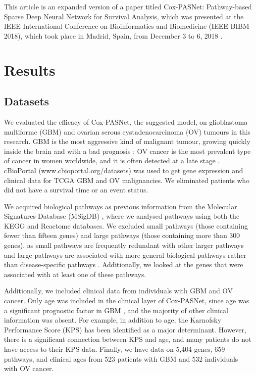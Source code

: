 \documentclass[10pt,twocolumn,twoside,lineno]{gsajnl}
\begin{document}
This article is an expanded version of a paper titled Cox-PASNet: Pathway-based Sparse Deep Neural Network for Survival Analysis, which was presented at the IEEE International Conference on Bioinformatics and Biomedicine (IEEE BIBM 2018), which took place in Madrid, Spain, from December 3 to 6, 2018 \citep{8621345}. 


\section{Results}
\subsection{Datasets}

We evaluated the efficacy of Cox-PASNet, the suggested model, on glioblastoma multiforme (GBM) and ovarian serous cystadenocarcinoma (OV) tumours in this research. GBM is the most aggressive kind of malignant tumour, growing quickly inside the brain and with a bad prognosis \citep{no28}; OV cancer is the most prevalent type of cancer in women worldwide, and it is often detected at a late stage \citep{BrettM2017}. cBioPortal (www.cbioportal.org/datasets) was used to get gene expression and clinical data for TCGA GBM and OV malignancies. We eliminated patients who did not have a survival time or an event status.


We acquired biological pathways as previous information from the Molecular Signatures Database (MSigDB) \citep{Subramanian15545}, where we analysed pathways using both the KEGG and Reactome databases. We excluded small pathways (those containing fewer than fifteen genes) and large pathways (those containing more than 300 genes), as small pathways are frequently redundant with other larger pathways and large pathways are associated with more general biological pathways rather than disease-specific pathways \citep{Reimand2019}. Additionally, we looked at the genes that were associated with at least one of these pathways.


Additionally, we included clinical data from individuals with GBM and OV cancer. Only age was included in the clinical layer of Cox-PASNet, since age was a significant prognostic factor in GBM \citep{10.1371/journal.pone.0154313}, and the majority of other clinical information was absent. For example, in addition to age, the Karnofsky Performance Score (KPS) has been identified as a major determinant. However, there is a significant connection between KPS and age, and many patients do not have access to their KPS data. Finally, we have data on 5,404 genes, 659 pathways, and clinical ages from 523 patients with GBM and 532 individuals with OV cancer.
\end{document}
